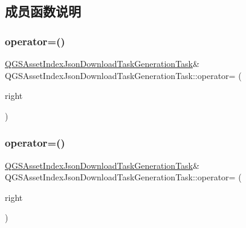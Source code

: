 \subsection{成员函数说明}
\mbox{\label{class_q_g_s_asset_index_json_download_task_generation_task_a60b3803995b0094f04baec39dc7bc3a9}} 
\subsubsection{\texorpdfstring{operator=()}{operator=()}\hspace{0.1cm}{\footnotesize\ttfamily [1/2]}}
{\footnotesize\ttfamily \mbox{\hyperlink{class_q_g_s_asset_index_json_download_task_generation_task}{Q\+G\+S\+Asset\+Index\+Json\+Download\+Task\+Generation\+Task}}\& Q\+G\+S\+Asset\+Index\+Json\+Download\+Task\+Generation\+Task\+::operator= (\begin{DoxyParamCaption}\item[{const \mbox{\hyperlink{class_q_g_s_asset_index_json_download_task_generation_task}{Q\+G\+S\+Asset\+Index\+Json\+Download\+Task\+Generation\+Task}} \&}]{right }\end{DoxyParamCaption})\hspace{0.3cm}{\ttfamily [delete]}}

\mbox{\label{class_q_g_s_asset_index_json_download_task_generation_task_a09ce61b1c36b94f45e824886a23e4e18}} 
\subsubsection{\texorpdfstring{operator=()}{operator=()}\hspace{0.1cm}{\footnotesize\ttfamily [2/2]}}
{\footnotesize\ttfamily \mbox{\hyperlink{class_q_g_s_asset_index_json_download_task_generation_task}{Q\+G\+S\+Asset\+Index\+Json\+Download\+Task\+Generation\+Task}}\& Q\+G\+S\+Asset\+Index\+Json\+Download\+Task\+Generation\+Task\+::operator= (\begin{DoxyParamCaption}\item[{\mbox{\hyperlink{class_q_g_s_asset_index_json_download_task_generation_task}{Q\+G\+S\+Asset\+Index\+Json\+Download\+Task\+Generation\+Task}} \&\&}]{right }\end{DoxyParamCaption})\hspace{0.3cm}{\ttfamily [delete]}}

